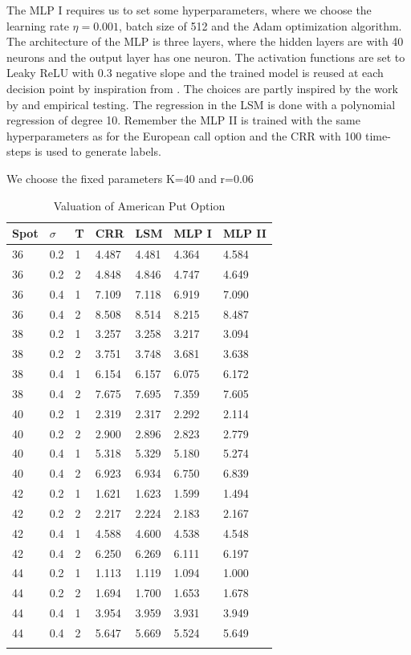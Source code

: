 The MLP I requires us to set some hyperparameters, where we choose the learning rate $\eta=0.001$, batch size of 512 and the Adam optimization algorithm. The architecture of the MLP is three layers, where the hidden layers are with 40 neurons and the output layer has one neuron. The activation functions are set to Leaky ReLU with 0.3 negative slope and the trained model is reused at each decision point by inspiration from \parencite{Lelong19}. The choices are partly inspired by the work by \parencite{Lelong19} and empirical testing. The regression in the LSM is done with a polynomial regression of degree 10. Remember the MLP II is trained with the same hyperparameters as for the European call option and the CRR with 100 time-steps is used to generate labels.\\

\begin{table}[th]
\caption{Valuation of American Put Option}{We choose the fixed parameters K=40 and r=0.06}
\label{tab:AmericanPut}
\centering
\begin{tabular}{l l l l l l l }
\toprule
\textbf{Spot} & \textbf{$\sigma$} & \textbf{T} & \textbf{CRR} & \textbf{LSM} & \textbf{MLP I} & \textbf{MLP II} \\
\midrule
36 & 0.2 & 1 & 4.487 & 4.481 & 4.364 & 4.584\\
36 & 0.2 & 2 & 4.848 & 4.846 & 4.747 & 4.649\\
36 & 0.4 & 1 & 7.109 & 7.118 & 6.919 & 7.090\\
36 & 0.4 & 2 & 8.508 & 8.514 & 8.215 & 8.487\\
38 & 0.2 & 1 & 3.257 & 3.258 & 3.217 & 3.094\\
38 & 0.2 & 2 & 3.751 & 3.748 & 3.681 & 3.638\\
38 & 0.4 & 1 & 6.154 & 6.157 & 6.075 & 6.172\\
38 & 0.4 & 2 & 7.675 & 7.695 & 7.359 & 7.605\\
40 & 0.2 & 1 & 2.319 & 2.317 & 2.292 & 2.114\\
40 & 0.2 & 2 & 2.900 & 2.896 & 2.823 & 2.779\\
40 & 0.4 & 1 & 5.318 & 5.329 & 5.180 & 5.274\\
40 & 0.4 & 2 & 6.923 & 6.934 & 6.750 & 6.839\\
42 & 0.2 & 1 & 1.621 & 1.623 & 1.599 & 1.494\\
42 & 0.2 & 2 & 2.217 & 2.224 & 2.183 & 2.167\\
42 & 0.4 & 1 & 4.588 & 4.600 & 4.538 & 4.548\\
42 & 0.4 & 2 & 6.250 & 6.269 & 6.111 & 6.197\\
44 & 0.2 & 1 & 1.113 & 1.119 & 1.094 & 1.000\\
44 & 0.2 & 2 & 1.694 & 1.700 & 1.653 & 1.678\\
44 & 0.4 & 1 & 3.954 & 3.959 & 3.931 & 3.949\\
44 & 0.4 & 2 & 5.647 & 5.669 & 5.524 & 5.649\\
\bottomrule\\
\end{tabular}
\end{table}

